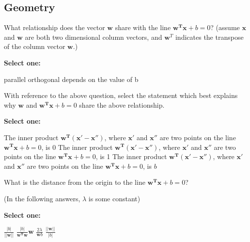 \documentclass[11pt,addpoints,answers]{exam}
\numberwithin{equation}{section} %
\numberwithin{figure}{section} %
\numberwithin{table}{section} %
\newcommand{\wv}{\mathbf{w}}
\begin{document}
\subsection{Geometry}
\begin{questions}
    \question[2] What relationship does the vector $\wv$ share with the line $\mathbf{w^Tx}+b = 0$?
    (assume $\mathbf{x}$ and $\mathbf{w}$ are both two dimensional column vectors, and $\mathbf{w}^T$ indicates the transpose of the column vector $\mathbf{w}$.)
    
    \textbf{Select one:}
    \begin{checkboxes}{}
        \choice parallel
        \choice orthogonal
        \choice depends on the value of b
    \end{checkboxes}

    
    \question[1] With reference to the above question, select the statement which best explains why $\mathbf{w}$ and $\mathbf{w^Tx} + b = 0$ share the above relationship.
            
    \textbf{Select one:}
    \begin{checkboxes}{}
        \choice The inner product $\mathbf{w^T(x' - x'')}$, where $\mathbf{x'}$ and $\mathbf{x''}$ are two points on the line $\mathbf{w^Tx}+b=0$, is 0
        \choice The inner product $\mathbf{w^T(x' - x'')}$, where $\mathbf{x'}$ and $\mathbf{x''}$ are two points on the line $\mathbf{w^Tx}+b=0$, is 1
        \choice The inner product $\mathbf{w^T(x' - x'')}$, where $\mathbf{x'}$ and $\mathbf{x''}$ are two points on the line $\mathbf{w^Tx}+b=0$, is $b$
    \end{checkboxes}

    
    \question[2] What is the distance from the origin to the line $\mathbf{w^Tx}+b=0$?
    
    (In the following answers, $\lambda$ is some constant)
    
    \textbf{Select one:}
    \begin{checkboxes}{}
        \choice $\frac{|b|}{||\mathbf{w}||}$
        \choice $\frac{|b|}{\mathbf{w^Tw}}\mathbf{w}$
        \choice $\frac{2\lambda}{\mathbf{w}b}$
        \choice $\frac{||\mathbf{w}||}{|b|}$
    \end{checkboxes}


  

    \clearpage
\end{questions}
\end{document}
